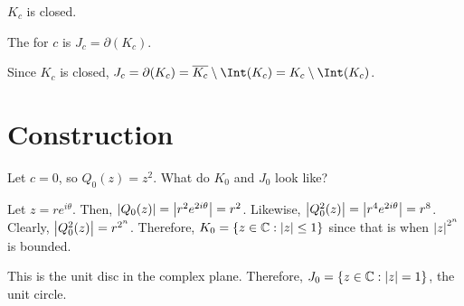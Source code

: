 \documentclass[class=pmath370,tikz,notes]{agony}
\begin{document}
\begin{lemma}[Assignment 4]
  $K_c$ is closed.
\end{lemma}

\begin{defn}
  The  for $c$ is $J_c = \partial(K_c)$.
\end{defn}

\begin{remark}
  Since $K_c$ is closed, $J_c = \partial(K_c) = \overline{K_c} \setminus \Int(K_c) = K_c \setminus \Int(K_c)$.
\end{remark}

\section{Construction}

\begin{example}
  Let $c = 0$, so $Q_0(z) = z^2$. What do $K_0$ and $J_0$ look like?
\end{example}
\begin{sol}
  Let $z = re^{i\theta}$.
  Then, $\abs{Q_0(z)} = \abs{r^2e^{2i\theta}} = r^2$.
  Likewise, $\abs{Q_0^2(z)} = \abs{r^4e^{2i\theta}} = r^8$.
  Clearly, $\abs{Q_0^2(z)} = r^{2^n}$.
  Therefore, $K_0 = \{z \in \mathbb{C} : \abs{z} \leq 1\}$
  since that is when $\abs{z}^{2^n}$ is bounded.

  This is the unit disc in the complex plane.
  Therefore, $J_0 = \{z \in \mathbb{C} : \abs{z} = 1\}$, the unit circle.
\end{sol}
\end{document}
